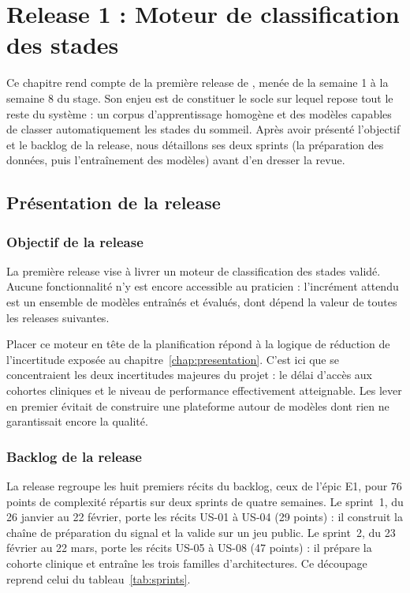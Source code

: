 \chapter{Release 1 : Moteur de classification des stades}
\label{chap:release1}


Ce chapitre rend compte de la première release de \hypnoria{}, menée de la semaine 1 à la
semaine 8 du stage. Son enjeu est de constituer le socle sur lequel repose tout le reste du
système : un corpus d'apprentissage homogène et des modèles capables de classer
automatiquement les stades du sommeil. Après avoir présenté l'objectif et le backlog de la
release, nous détaillons ses deux sprints (la préparation des données, puis
l'entraînement des modèles) avant d'en dresser la revue.

\section{Présentation de la release}
\label{sec:release1}

\subsection{Objectif de la release}

La première release vise à livrer un moteur de classification des stades validé.
Aucune fonctionnalité n'y est encore accessible au praticien : l'incrément attendu est un
ensemble de modèles entraînés et évalués, dont dépend la valeur de toutes les releases
suivantes.

Placer ce moteur en tête de la planification répond à la logique de réduction de
l'incertitude exposée au chapitre~\ref{chap:presentation}. C'est ici que se concentraient
les deux incertitudes majeures du projet : le délai d'accès aux cohortes cliniques et le
niveau de performance effectivement atteignable. Les lever en premier évitait de construire
une plateforme autour de modèles dont rien ne garantissait encore la qualité.

\subsection{Backlog de la release}

La release regroupe les huit premiers récits du backlog, ceux de l'épic E1, pour
76 points de complexité répartis sur deux sprints de quatre semaines. Le sprint~1, du
26 janvier au 22 février, porte les récits US-01 à US-04 (29 points) : il construit la
chaîne de préparation du signal et la valide sur un jeu public. Le sprint~2, du 23 février
au 22 mars, porte les récits US-05 à US-08 (47 points) : il prépare la cohorte clinique et
entraîne les trois familles d'architectures. Ce découpage reprend celui du
tableau~\ref{tab:sprints}.

